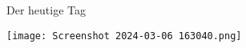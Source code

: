 \begin{frame}{Der heutige Tag}



 
     
\texttt{[image: Screenshot 2024-03-06 163040.png]}\\ \, 
\end{frame}
    